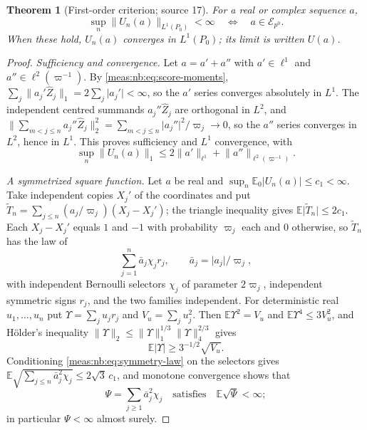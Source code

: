 \documentclass[11pt]{article}
\numberwithin{equation}{section}
\newtheorem{theorem}{Theorem}[section]
\theoremstyle{definition}
\theoremstyle{remark}
\newcommand{\E}{\mathbb E}
\newcommand{\norm}[1]{\lVert#1\rVert}
\newcommand{\abs}[1]{\lvert#1\rvert}
\newcommand{\Zh}{\widehat Z}
\newcommand{\Erow}{\mathcal E_{p^0}}
\begin{document}
\begin{theorem}[First-order criterion; source 17]\label{meas:nb:thm:first}
For a real or complex sequence $a$,
\begin{equation}\label{meas:nb:eq:first-equivalence}
 \sup_n\norm{U_n(a)}_{L^1(P_0)}<\infty
 \quad\Longleftrightarrow\quad a\in\Erow .
\end{equation}
When these hold, $U_n(a)$ converges in $L^1(P_0)$; its limit is written $U(a)$.
\end{theorem}
\begin{proof}
\emph{Sufficiency and convergence.} Let $a=a'+a''$ with $a'\in\ell^1$ and
$a''\in\ell^2(\varpi^{-1})$. By \eqref{meas:nb:eq:score-moments},
$\sum_j\norm{a_j'\Zh_j}_1=2\sum_j\abs{a_j'}<\infty$, so the $a'$ series converges
absolutely in $L^1$. The independent centred summands $a_j''\Zh_j$ are orthogonal
in $L^2$, and $\norm{\sum_{m<j\le n}a_j''\Zh_j}_2^2=\sum_{m<j\le n}\abs{a_j''}^2/\varpi_j\to0$,
so the $a''$ series converges in $L^2$, hence in $L^1$. This proves sufficiency and
$L^1$ convergence, with
\begin{equation}\label{meas:nb:eq:first-upper}
 \sup_n\norm{U_n(a)}_1\le2\norm{a'}_{\ell^1}+\norm{a''}_{\ell^2(\varpi^{-1})}.
\end{equation}

\emph{A symmetrized square function.} Let $a$ be real and
$\sup_n\E_0\abs{U_n(a)}\le c_1<\infty$. Take independent copies $X_j'$ of the
coordinates and put $\widetilde T_n=\sum_{j\le n}(a_j/\varpi_j)(X_j-X_j')$; the
triangle inequality gives $\E\abs{\widetilde T_n}\le2c_1$. Each $X_j-X_j'$ equals $1$
and $-1$ with probability $\varpi_j$ each and $0$ otherwise, so $\widetilde T_n$ has
the law of
\begin{equation}\label{meas:nb:eq:symmetry-law}
 \sum_{j=1}^n\bar a_j\chi_jr_j,\qquad \bar a_j=\abs{a_j}/\varpi_j,
\end{equation}
with independent Bernoulli selectors $\chi_j$ of parameter $2\varpi_j$, independent
symmetric signs $r_j$, and the two families independent. For deterministic real
$u_1,\ldots,u_n$ put $\Upsilon=\sum_ju_jr_j$ and $V_u=\sum_ju_j^2$. Then $\E\Upsilon^2=V_u$
and $\E\Upsilon^4\le3V_u^2$, and H\"older's inequality
$\norm\Upsilon_2\le\norm\Upsilon_1^{1/3}\norm\Upsilon_4^{2/3}$ gives
\begin{equation}\label{meas:nb:eq:khintchine}
 \E\abs\Upsilon\ge3^{-1/2}\sqrt{V_u}.
\end{equation}
Conditioning \eqref{meas:nb:eq:symmetry-law} on the selectors gives
$\E\sqrt{\sum_{j\le n}\bar a_j^2\chi_j}\le2\sqrt3\,c_1$, and monotone convergence shows
that
\begin{equation}\label{meas:nb:eq:Psi}
 \Psi=\sum_{j\ge1}\bar a_j^2\chi_j\quad\text{satisfies}\quad\E\sqrt\Psi<\infty ;
\end{equation}
in particular $\Psi<\infty$ almost surely.


\end{proof}
\end{document}
